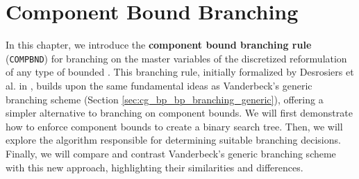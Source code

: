 \chapter{Component Bound Branching}\label{ch:cmpbnd}
In this chapter, we introduce the \textbf{component bound branching rule} (\texttt{COMPBND}) for branching on the master variables of the discretized reformulation of any type of bounded \IP{}. This branching rule, initially formalized by Desrosiers et al. in \cite{thebook}, builds upon the same fundamental ideas as Vanderbeck's generic branching scheme (Section \ref{sec:cg_bp_bp_branching_generic}), offering a simpler alternative to branching on component bounds. We will first demonstrate how to enforce component bounds to create a binary search tree. Then, we will explore the algorithm responsible for determining suitable branching decisions. Finally, we will compare and contrast Vanderbeck's generic branching scheme with this new approach, highlighting their similarities and differences.



